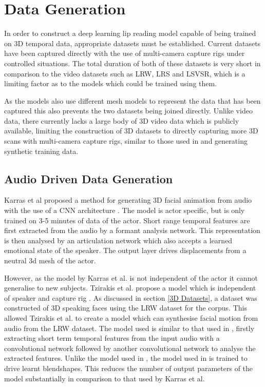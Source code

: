 \documentclass[12pt]{report}
\begin{document}
\section{Data Generation}
In order to construct a deep learning lip reading model capable of being trained on 3D temporal data, appropriate datasets must be established.
Current datasets have been captured directly \cite{Tzirakis2019, Cudeiro2019} with the use of multi-camera capture rigs under controlled situations.
The total duration of both of these datasets is very short in comparison to the video datasets such as LRW, LRS and LSVSR, which is a limiting factor as to the models which could be trained using them.

As the models also use different mesh models to represent the data that has been captured this also prevents the two datasets being joined directly.
Unlike video data, there currently lacks a large body of 3D video data which is publicly available, limiting the construction of 3D datasets to directly capturing more 3D scans with multi-camera capture rigs, similar to those used in \cite{Tzirakis2019, Cudeiro2019} and generating synthetic training data.

\subsection{Audio Driven Data Generation}
Karras et al proposed a method for generating 3D facial animation from audio with the use of a CNN architecture \cite{Karras2017a}.
The model is actor specific, but is only trained on 3-5 minutes of data of the actor.
Short range temporal features are first extracted from the audio by a formant analysis network.
This representation is then analysed by an articulation network which also accepts a learned emotional state of the speaker.
The output layer drives displacements from a neutral 3d mesh of the actor.

However, as the model by Karras et al. is not independent of the actor it cannot generalise to new subjects.
Tzirakis et al. propose a model which is independent of speaker and capture rig \cite{Tzirakis2019}.
As discussed in section \ref{3D Datasets}, a dataset was constructed of 3D speaking faces using the LRW dataset \cite{Chung2016} for the corpus.
This allowed Tzirakis et al. to create a model which can synthesise facial motion from audio from the LRW dataset.
The model used is similar to that used in \cite{Karras2017a}, firstly extracting short term temporal features from the input audio with a convolutional network followed by another convolutional network to analyse the extracted features.
Unlike the model used in \cite{Karras2017a}, the model used in \cite{Tzirakis2019} is trained to drive learnt blendshapes.
This reduces the number of output parameters of the model substantially in comparison to that used by Karras et al.
\end{document}
